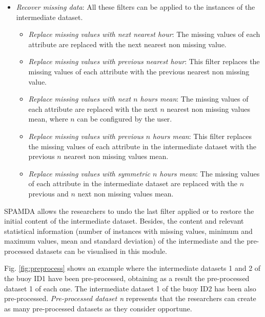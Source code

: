 \documentclass[review]{elsarticle}
\begin{document}
\begin{itemize}
				 \item \textit{Recover missing data}: All these filters can be applied to the instances of the intermediate dataset.
					\begin{itemize}
						\item \textit{Replace missing values with next nearest hour}: The missing values of each attribute are replaced with the next nearest non missing value.
						\item \textit{Replace missing values with previous nearest hour}: This filter replaces the missing values of each attribute with the previous nearest non missing value.
						\item \textit{Replace missing values with next $n$ hours mean}: The missing values of each attribute are replaced with the next $n$ nearest non missing values mean, where $n$ can be configured by the user.
						\item \textit{Replace missing values with previous $n$ hours mean}: This filter replaces the missing values of each attribute in the intermediate dataset with the previous $n$ nearest non missing values mean.
						\item \textit{Replace missing values with symmetric $n$ hours mean}: The missing values of each attribute in the intermediate dataset are replaced with the $n$ previous and $n$ next non missing values mean.
					\end{itemize}
				 
				\end{itemize}
				
				SPAMDA allows the researchers to undo the last filter applied or to restore the initial content of the intermediate dataset. Besides, the content and relevant statistical information (number of instances with missing values, minimum and maximum values, mean and standard deviation) of the intermediate and the pre-processed datasets can be visualised in this module.
				
				Fig. \ref{fig:preprocess} shows an example where the intermediate datasets 1 and 2 of the buoy ID1 have been pre-processed, obtaining as a result the pre-processed dataset 1 of each one. The intermediate dataset 1 of the buoy ID2 has been also pre-processed. \textit{Pre-processed dataset n} represents that the researchers can create as many pre-processed datasets as they consider opportune.
				
\end{document}
